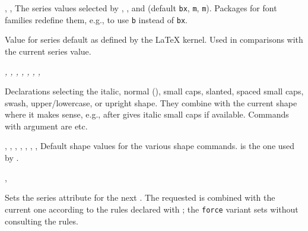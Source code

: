 \documentclass{l3in2edoc}
\begin{document}
\begin{variable}[]
  {
    \bfdefault,
    \mddefault,
    \seriesdefault
  }
  The series values selected by , , and
   (default \texttt{bx}, \texttt{m}, \texttt{m}).
  Packages for font families redefine them, e.g., to use
  \texttt{b} instead of \texttt{bx}.
\end{variable}




\begin{function}[int]
  {
    \seriesdefault@kernel
  }
%
  Value for series default as defined by the \LaTeX{} kernel. Used in
  comparisons with the current series value.
\end{function}



\begin{function}[user]
  {
    \itshape,
    \normalshape,
    \scshape,
    \slshape,
    \sscshape,
    \swshape,
    \ulcshape,
    \upshape
  }
  \begin{syntax}
  \end{syntax}
  Declarations selecting the italic, normal (),
  small caps, slanted, spaced small caps, swash, upper/lowercase, or
  upright shape. They combine with the current shape where it makes
  sense, e.g.,  after  gives italic small
  caps if available. Commands with argument are  etc.
\end{function}


\begin{variable}[user]
  {
    \itdefault,
    \scdefault,
    \shapedefault,
    \sldefault,
    \sscdefault,
    \swdefault,
    \ulcdefault,
    \updefault
  }
%
  Default shape values for the various shape
  commands.  is the one used by .
\end{variable}



\begin{function}[user]
  {
    \fontseries,
    \fontseriesforce
  }
  \begin{syntax}
     
  \end{syntax}
  Sets the series attribute for the next . The
  requested  is combined with the current one according
  to the rules declared with ; the
  \texttt{force} variant sets  without consulting
  the rules.
\end{function}
\end{document}
